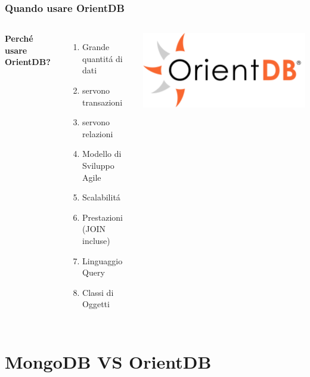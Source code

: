 \documentclass{beamer}
\begin{document}
\begin{frame}
\frametitle{Quando usare OrientDB}
\begin{columns}[c] %

\textbf{Perch\'e usare OrientDB?}
\begin{enumerate}
\item Grande quantit\'a di dati
\item servono transazioni
\item servono relazioni
\item Modello di Sviluppo Agile
\item Scalabilit\'a
\item Prestazioni (JOIN incluse)
\item Linguaggio Query
\item Classi di Oggetti
\end{enumerate}

\includegraphics[width=1\linewidth]{orientdb.png}

\end{columns}
\end{frame}

\section{MongoDB VS OrientDB}
\end{document}
